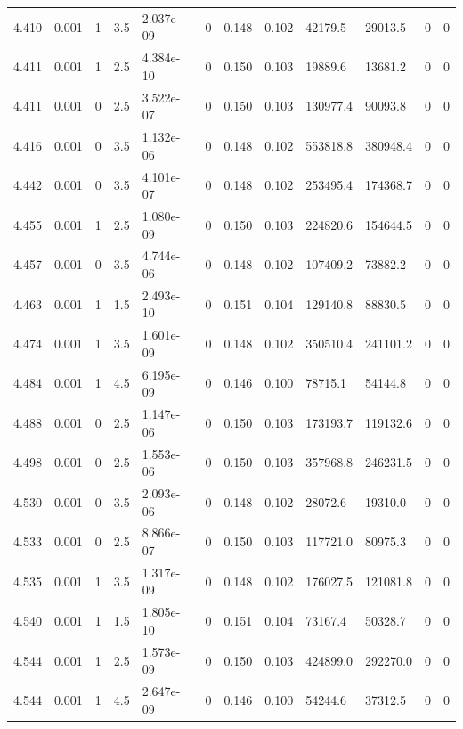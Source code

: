 \documentclass[preview]{standalone}
\begin{document}
{{{{{{{{{{\begin{tabular}{L{1.2cm}C{1.2cm} C{0.3cm}C{0.5cm} C{1.4cm}C{1.4cm} C{1.4cm}C{1.4cm} C{1.6cm}C{1.6cm} C{1.6cm}C{1.6cm}}
  4.410  &  0.001  & 1     & 3.5 &  2.037e-09  & 0  &  0.148&   0.102& 42179.5 & 29013.5   &  0 & 0  \\ 
  4.411  &  0.001  & 1     & 2.5 &  4.384e-10  & 0  &  0.150&   0.103& 19889.6 & 13681.2   &  0 & 0  \\ 
  4.411  &  0.001  & 0     & 2.5 &  3.522e-07  & 0  &  0.150&   0.103& 130977.4 & 90093.8   &  0 & 0  \\ 
  4.416  &  0.001  & 0     & 3.5 &  1.132e-06  & 0  &  0.148&   0.102& 553818.8 & 380948.4   &  0 & 0  \\ 
  4.442  &  0.001  & 0     & 3.5 &  4.101e-07  & 0  &  0.148&   0.102& 253495.4 & 174368.7   &  0 & 0  \\ 
  4.455  &  0.001  & 1     & 2.5 &  1.080e-09  & 0  &  0.150&   0.103& 224820.6 & 154644.5   &  0 & 0  \\ 
  4.457  &  0.001  & 0     & 3.5 &  4.744e-06  & 0  &  0.148&   0.102& 107409.2 & 73882.2   &  0 & 0  \\ 
  4.463  &  0.001  & 1     & 1.5 &  2.493e-10  & 0  &  0.151&   0.104& 129140.8 & 88830.5   &  0 & 0  \\ 
  4.474  &  0.001  & 1     & 3.5 &  1.601e-09  & 0  &  0.148&   0.102& 350510.4 & 241101.2   &  0 & 0  \\ 
  4.484  &  0.001  & 1     & 4.5 &  6.195e-09  & 0  &  0.146&   0.100& 78715.1 & 54144.8   &  0 & 0  \\ 
  4.488  &  0.001  & 0     & 2.5 &  1.147e-06  & 0  &  0.150&   0.103& 173193.7 & 119132.6   &  0 & 0  \\ 
  4.498  &  0.001  & 0     & 2.5 &  1.553e-06  & 0  &  0.150&   0.103& 357968.8 & 246231.5   &  0 & 0  \\ 
  4.530  &  0.001  & 0     & 3.5 &  2.093e-06  & 0  &  0.148&   0.102& 28072.6 & 19310.0   &  0 & 0  \\ 
  4.533  &  0.001  & 0     & 2.5 &  8.866e-07  & 0  &  0.150&   0.103& 117721.0 & 80975.3   &  0 & 0  \\ 
  4.535  &  0.001  & 1     & 3.5 &  1.317e-09  & 0  &  0.148&   0.102& 176027.5 & 121081.8   &  0 & 0  \\ 
  4.540  &  0.001  & 1     & 1.5 &  1.805e-10  & 0  &  0.151&   0.104& 73167.4 & 50328.7   &  0 & 0  \\ 
  4.544  &  0.001  & 1     & 2.5 &  1.573e-09  & 0  &  0.150&   0.103& 424899.0 & 292270.0   &  0 & 0  \\ 
  4.544  &  0.001  & 1     & 4.5 &  2.647e-09  & 0  &  0.146&   0.100& 54244.6 & 37312.5   &  0 & 0  \\ 

\end{tabular}}}}}}}}}}}
\end{document}
